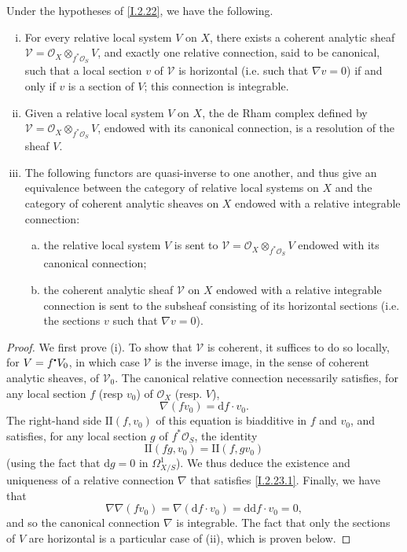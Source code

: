 \documentclass{report}
\theoremstyle{plain}
\newenvironment{theorem}[1]
    {\renewcommand\theinnercustomtheorem{#1}\innercustomtheorem}
    {\endinnercustomlemma}
\theoremstyle{definition}
\newcommand{\sh}[1]{{\mathscr{#1}}}
\newcommand{\sbullet}{{\mathbin{\vcenter{\hbox{\scalebox{.5}{$\bullet$}}}}}}
\newcommand{\dd}{\mathrm{d}}
\newcommand{\II}{\mathrm{II}}
\newcommand{\oldpage}[1]{\marginpar{\footnotesize$\Big\vert$ \textit{p.~#1}}}
\begin{document}
\begin{theorem}{2.23}
\label{I.2.23}
  Under the hypotheses of \cref{I.2.22}, we have the following.
  \begin{enumerate}[(i)]
    \item For every relative local system $V$ on $X$, there exists a coherent analytic sheaf \mbox{$\sh{V}=\sh{O}_X\otimes_{f^*\sh{O}_S}V$}, and exactly one relative connection, said to be canonical, such that a local section $v$ of $\sh{V}$ is horizontal (i.e. such that $\nabla v=0$) if and only if $v$ is a section of $V$;
      this connection is integrable.
    \item Given a relative local system $V$ on $X$, the de Rham complex defined
\oldpage{15}
      by $\sh{V}=\sh{O}_X\otimes_{f^*\sh{O}_S}V$, endowed with its canonical connection, is a resolution of the sheaf $V$.
    \item The following functors are quasi-inverse to one another, and thus give an equivalence between the category of relative local systems on $X$ and the category of coherent analytic sheaves on $X$ endowed with a relative integrable connection:
      \begin{enumerate}[a)]
        \item the relative local system $V$ is sent to $\sh{V}=\sh{O}_X\otimes_{f^*\sh{O}_S}V$ endowed with its canonical connection;
        \item the coherent analytic sheaf $\sh{V}$ on $X$ endowed with a relative integrable connection is sent to the subsheaf consisting of its horizontal sections (i.e. the sections $v$ such that $\nabla v=0$).
      \end{enumerate}
  \end{enumerate}
\end{theorem}

\begin{proof}
  We first prove (i).
  To show that $\sh{V}$ is coherent, it suffices to do so locally, for $V=f^\sbullet V_0$, in which case $\sh{V}$ is the inverse image, in the sense of coherent analytic sheaves, of $\sh{V}_0$.
  The canonical relative connection necessarily satisfies, for any local section $f$ (resp $v_0$) of $\sh{O}_X$ (resp. $V$),
  \[
  \label{I.2.23.1}
    \nabla(fv_0) = \dd f\cdot v_0.
  \tag{2.23.1}
  \]
  The right-hand side $\II(f,v_0)$ of this equation is biadditive in $f$ and $v_0$, and satisfies, for any local section $g$ of $f^*\sh{O}_S$, the identity
  \[
    \II(fg,v_0) = \II(f,gv_0)
  \]
  (using the fact that $\dd g=0$ in $\Omega_{X/S}^1$).
  We thus deduce the existence and uniqueness of a relative connection $\nabla$ that satisfies \cref{I.2.23.1}.
  Finally, we have that
  \[
    \nabla\nabla(fv_0) = \nabla(\dd f\cdot v_0) = \dd\dd f\cdot v_0 = 0,
  \]
  and so the canonical connection $\nabla$ is integrable.
  The fact that only the sections of $V$ are horizontal is a particular case of (ii), which is proven below.
\end{proof}
\end{document}
